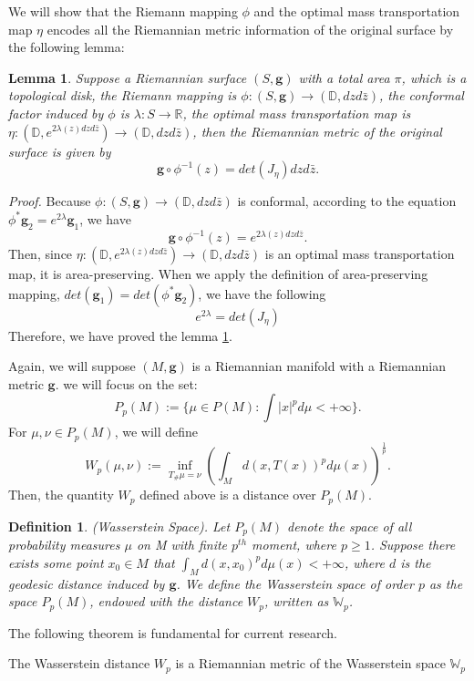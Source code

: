 \documentclass[runningheads]{llncs}
\newtheorem{mydef}{Definition}
\newtheorem{mylem}{Lemma}
\begin{document}
We will show that the Riemann mapping $\phi$ and the optimal mass transportation map $\eta$ encodes all the Riemannian metric information of the original surface by the following lemma:
\begin{mylem}\label{lem:2.1}
Suppose a Riemannian surface $(S,\mathbf{g})$ with a total area $\pi$, which is a topological disk, the Riemann mapping is $\phi:(S,\mathbf{g})\rightarrow (\mathbb{D},dzd\bar{z})$, the conformal factor induced by $\phi$ is $\lambda:S\rightarrow \mathbb{R}$, the optimal mass transportation map is $\eta:(\mathbb{D},e^{2\lambda(z)dzd\bar{z}})\rightarrow (\mathbb{D},dzd\bar{z})$, then the Riemannian metric of the original surface is given by $$\mathbf{g}\circ \phi^{-1}(z)=det(J_\eta)dzd\bar{z}.$$
\end{mylem}
\textit{Proof.} Because $\phi:(S,\mathbf{g})\rightarrow (\mathbb{D},dzd\bar{z})$ is conformal, according to the equation $\phi^*\mathbf{g}_2=e^{2\lambda}\mathbf{g}_1$, we have $$\mathbf{g}\circ \phi^{-1}(z)=e^{2\lambda(z)dzd\bar{z}}.$$
Then, since $\eta:(\mathbb{D},e^{2\lambda(z)dzd\bar{z}})\rightarrow (\mathbb{D},dzd\bar{z})$ is an optimal mass transportation map, it is area-preserving. When we apply the definition of area-preserving mapping, $det(\mathbf{g}_1)=det(\phi^*\mathbf{g}_2)$, we have the following $$e^{2\lambda}=det(J_\eta)$$ Therefore, we have proved the lemma \ref{lem:2.1}.


 Again, we will suppose $(M, \mathbf{g})$ is a Riemannian manifold with a Riemannian metric $\mathbf{g}$. we will focus on the set: $$P_p(M):=\{\mu\in P(M): \int|x|^pd\mu<+\infty\}.$$
For $\mu,\nu\in P_p(M)$, we will define $$W_p(\mu,\nu):=\inf_{T_\#\mu=\nu}(\int_Md(x,T(x))^pd\mu(x))^{\frac{1}{p}}.$$ Then, the quantity $W_p$ defined above is a distance over $P_p(M)$.

\begin{mydef}
(Wasserstein Space). Let $P_p(M)$ denote the space of all probability measures $\mu$ on M with finite $p^{th}$ moment, where $p\geq 1$. Suppose there exists some point $x_0\in M$ that $\int_Md(x,x_0)^pd\mu(x)<+\infty$, where $d$ is the geodesic distance induced by $\mathbf{g}$. We define the Wasserstein space of order $p$ as the space $P_p(M)$, endowed with the distance $W_p$, written as $\mathbb{W}_p$.
\end{mydef}



The following theorem is fundamental for current research.
\begin{theorem}
The Wasserstein distance $W_p$ is a Riemannian metric of the Wasserstein space $\mathbb{W}_p$
\end{theorem}
\end{document}
